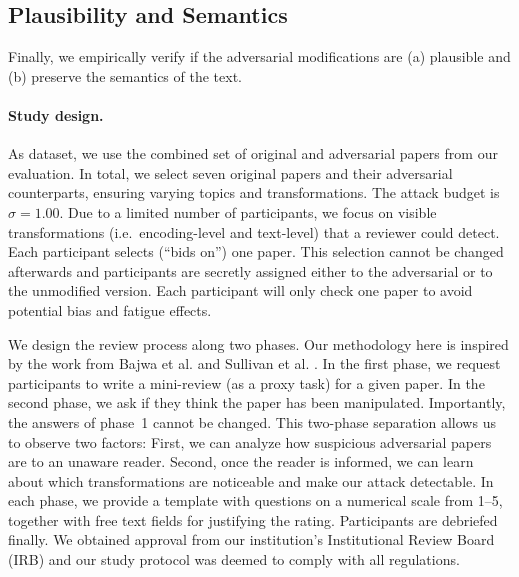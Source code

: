 \documentclass[letterpaper,twocolumn,10pt]{article}
\newcommand{\attackbudgetscale}{\sigma}
\begin{document}
\subsection{Plausibility and Semantics}
\label{sec:user-study}
Finally, we empirically verify if the adversarial modifications are (a) {plausible\EndAccSupp{}} and (b) preserve the semantics of the text. 

\paragraph{Study design.}
As dataset, we use the combined set of original and adversarial papers from our evaluation.
In total, we select seven original papers and their adversarial counterparts, ensuring varying topics and transformations. The attack budget is $\attackbudgetscale = 1.00$. 
Due to a limited number of participants, we focus on visible transformations (i.e.\ encoding-level and text-level) that a reviewer could detect.
Each participant selects (``{bids\EndAccSupp{}} on'') one paper. This selection cannot be changed afterwards and participants are secretly assigned either to the adversarial or to the unmodified version. Each participant will only check one paper to avoid potential bias and {fatigue\EndAccSupp{}} effects.


We design the review process along two phases. Our methodology here is inspired by the work from Bajwa et al. \cite{bajwa-2019-might} and {Sullivan\EndAccSupp{}} et al. \cite{sullivan-10-reviewer}. In the first phase, we request participants to write a mini-review (as a proxy task) for a given paper. In the second phase, we ask if they think the paper has been manipulated. Importantly, the answers of phase~1 cannot be changed. This two-phase separation allows us to observe two factors: First, we can analyze how suspicious adversarial papers are to an unaware reader. Second, once the reader is informed, we can learn about which transformations are noticeable and make our attack detectable.
In each phase, we provide a template with questions on a numerical scale from 1--5, together with free text fields for justifying the rating.
Participants are {debriefed\EndAccSupp{}} finally.
We obtained approval from our institution's Institutional Review Board (IRB) and our study protocol was {deemed\EndAccSupp{}} to {comply\EndAccSupp{}} with all  regulations.
\end{document}
